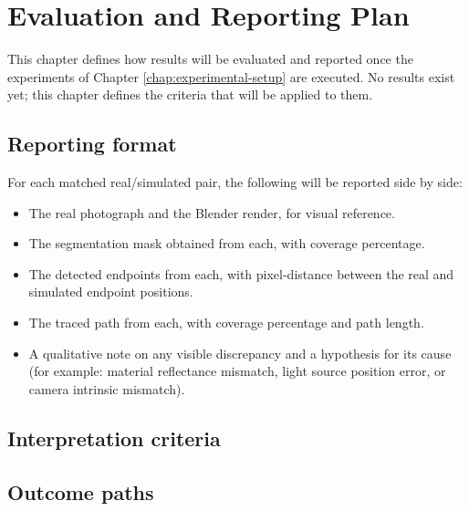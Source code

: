 \chapter{Evaluation and Reporting Plan}
\label{chap:results}

This chapter defines how results will be evaluated and reported once the experiments of Chapter \ref{chap:experimental-setup} are executed. No results exist yet; this chapter defines the criteria that will be applied to them.

\section{Reporting format}

For each matched real/simulated pair, the following will be reported side by side:

\begin{itemize}
    \item The real photograph and the Blender render, for visual reference.
    \item The segmentation mask obtained from each, with coverage percentage.
    \item The detected endpoints from each, with pixel-distance between the real and simulated endpoint positions.
    \item The traced path from each, with coverage percentage and path length.
    \item A qualitative note on any visible discrepancy and a hypothesis for its cause (for example: material reflectance mismatch, light source position error, or camera intrinsic mismatch).
\end{itemize}

\section{Interpretation criteria}


\section{Outcome paths}

